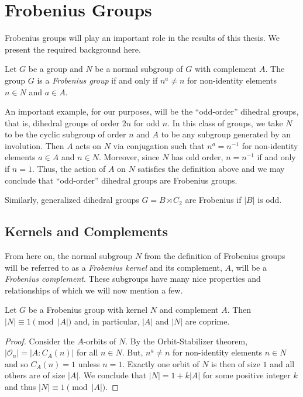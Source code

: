 \documentclass[main.tex]{subfiles}
\begin{document}
\section{Frobenius Groups}

Frobenius groups will play an important role in the results of this thesis. We present the required background here.

\hss

\begin{definition}
Let $G$ be a group and $N$ be a normal subgroup of $G$ with complement $A$. The group $G$ is a \emph{Frobenius group} if and only if $n^a \ne n$ for non-identity elements $n \in N$ and $a \in A$.
\end{definition}

\hss

An important example, for our purposes, will be the ``odd-order'' dihedral groups, that is, dihedral groups of order $2n$ for odd $n$. In this class of groups, we take $N$ to be the cyclic subgroup of order $n$ and $A$ to be any subgroup generated by an involution. Then $A$ acts on $N$ via conjugation such that $n^a = n^{-1}$ for non-identity elements $a \in A$ and $n \in N$. Moreover, since $N$ has odd order, $n = n^{-1}$ if and only if $n = 1$. Thus, the action of $A$ on $N$ satisfies the definition above and we may conclude that ``odd-order'' dihedral groups are Frobenius groups.

Similarly, generalized dihedral groups $G = B \rtimes C_2$ are Frobenius if $|B|$ is odd.

\hss

\subsection{Kernels and Complements}

\hss

From here on, the normal subgroup $N$ from the definition of Frobenius groups will be referred to as a \emph{Frobenius kernel} and its complement, $A$, will be a \emph{Frobenius complement}. These subgroups have many nice properties and relationships of which we will now mention a few.

\begin{lemma}\label{frobeniuscoprime}
Let $G$ be a Frobenius group with kernel $N$ and complement $A$. Then $|N| \equiv 1 \pmod{|A|}$ and, in particular, $|A|$ and $|N|$ are coprime.
\end{lemma}

\begin{proof}
Consider the $A$-orbits of $N$. By the Orbit-Stabilizer theorem, $|\mathcal{O}_n| = |A : C_A(n)|$ for all $n \in N$. But, $n^a \ne n$ for non-identity elements $n \in N$ and so $C_A(n) = 1$ unless $n = 1$. Exactly one orbit of $N$ is then of size $1$ and all others are of size $|A|$. We conclude that $|N| = 1 + k |A|$ for some positive integer $k$ and thus $|N| \equiv 1 \pmod{|A|}$.
\end{proof}
\end{document}
